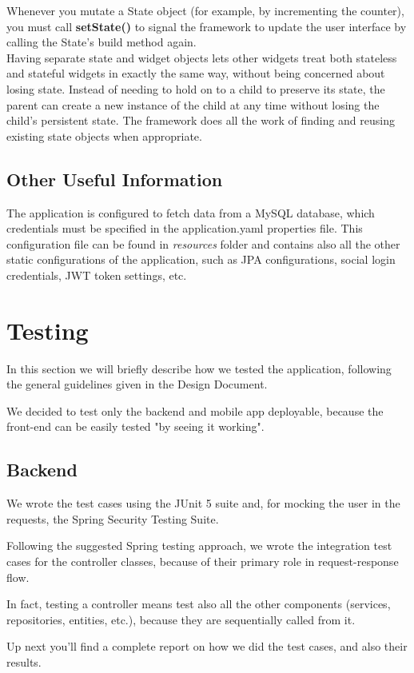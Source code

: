 \documentclass[table, 12pt]{article}
\begin{document}
Whenever you mutate a State object (for example, by incrementing the counter), you must call \textbf{setState()} to signal the framework to update the user interface by calling the State’s build method again.\\
Having separate state and widget objects lets other widgets treat both stateless and stateful widgets in exactly the same way, without being concerned about losing state. Instead of needing to hold on to a child to preserve its state, the parent can create a new instance of the child at any time without losing the child’s persistent state. The framework does all the work of finding and reusing existing state objects when appropriate.


\subsection{Other Useful Information}
The application is configured to fetch data from a MySQL database, which credentials must be specified in the application.yaml properties file. This configuration file can be found in \textit{resources} folder and contains also all the other static configurations of the application, such as JPA configurations, social login credentials, JWT token settings, etc.
\newpage
\section{Testing}
\label{testing}
In this section we will briefly describe how we tested the application, following the general guidelines given in the Design Document.

We decided to test only the backend and mobile app deployable, because the front-end can be easily tested "by seeing it working".
\subsection{Backend}
We wrote the test cases using the JUnit 5 suite and, for mocking the user in the requests, the Spring Security Testing Suite.

Following the suggested Spring testing approach, we wrote the integration test cases for the controller classes, because of their primary role in request-response flow.

In fact, testing a controller means test also all the other components (services, repositories, entities, etc.), because they are sequentially called from it.

Up next you'll find a complete report on how we did the test cases, and also their results.
\end{document}
